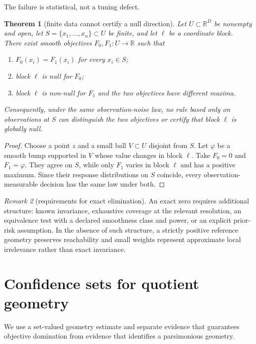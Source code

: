 \documentclass[11pt]{article}
\newtheorem{theorem}{Theorem}
\theoremstyle{definition}
\theoremstyle{remark}
\newtheorem{remark}[theorem]{Remark}
\newcommand{\R}{\mathbb R}
\newcommand{\1}{\mathbf 1}
\begin{document}
The failure is statistical, not a tuning defect.

\begin{theorem}[finite data cannot certify a null direction]\label{thm:no-collapse}
Let $U\subset\R^D$ be nonempty and open, let $S=\{x_1,\ldots,x_n\}\subset U$ be finite, and let
$\ell$ be a coordinate block.  There exist smooth objectives $F_0,F_1:U\to\R$ such that
\begin{enumerate}[label=(\roman*)]
\item $F_0(x_i)=F_1(x_i)$ for every $x_i\in S$;
\item block $\ell$ is null for $F_0$;
\item block $\ell$ is non-null for $F_1$ and the two objectives have different maxima.
\end{enumerate}
Consequently, under the same observation-noise law, no rule based only on observations at $S$ can
distinguish the two objectives or certify that block $\ell$ is globally null.
\end{theorem}
\begin{proof}
Choose a point $z$ and a small ball $V\subset U$ disjoint from $S$.  Let $\varphi$ be a smooth bump
supported in $V$ whose value changes in block $\ell$.  Take $F_0=0$ and $F_1=\varphi$.  They agree
on $S$, while only $F_1$ varies in block $\ell$ and has a positive maximum.  Since their response
distributions on $S$ coincide, every observation-measurable decision has the same law under both.
\end{proof}

\begin{remark}[requirements for exact elimination]
An exact zero requires additional structure: known invariance, exhaustive coverage at the relevant
resolution, an equivalence test with a declared smoothness class and power, or an explicit prior-risk
assumption.  In the absence of such structure, a strictly positive reference geometry preserves
reachability and small weights represent approximate local irrelevance rather than exact invariance.
\end{remark}

\section{Confidence sets for quotient geometry}

We use a set-valued geometry estimate and separate evidence that guarantees objective domination
from evidence that identifies a parsimonious geometry.
\end{document}
